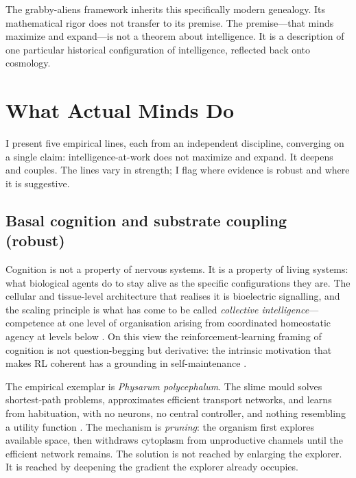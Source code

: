 \documentclass[11pt,a4paper,twocolumn]{article}
\begin{document}
The grabby-aliens framework inherits this specifically modern
genealogy. Its mathematical rigor does not transfer to its premise.
The premise---that minds maximize and expand---is not a theorem about
intelligence. It is a description of one particular historical
configuration of intelligence, reflected back onto cosmology.


\section{What Actual Minds Do}
\label{sec:minds}

I present five empirical lines, each from an independent discipline,
converging on a single claim: intelligence-at-work does not maximize and
expand. It deepens and couples. The lines vary in strength; I flag where
evidence is robust and where it is suggestive.

\subsection{Basal cognition and substrate coupling (robust)}

Cognition is not a property of nervous systems. It is a property of
living systems: what biological agents do to stay alive as the
specific configurations they are. The cellular and tissue-level
architecture that realises it is bioelectric signalling, and the
scaling principle is what has come to be called \emph{collective
intelligence}---competence at one level of organisation arising from
coordinated homeostatic agency at levels below
\citep{lyon2021,levin2023,mcmillen2024}. On this view the reinforcement-learning
framing of cognition is not question-begging but derivative: the
intrinsic motivation that makes RL coherent has a grounding in
self-maintenance \citep{seifert2024}.

The empirical exemplar is \textit{Physarum polycephalum}. The
slime mould solves shortest-path problems, approximates efficient
transport networks, and learns from habituation, with no neurons, no
central controller, and nothing resembling a utility function
\citep{tero2010,reid2023}. The mechanism is \emph{pruning}: the
organism first explores available space, then withdraws cytoplasm
from unproductive channels until the efficient network remains. The
solution is not reached by enlarging the explorer. It is reached by
deepening the gradient the explorer already occupies.
\end{document}
